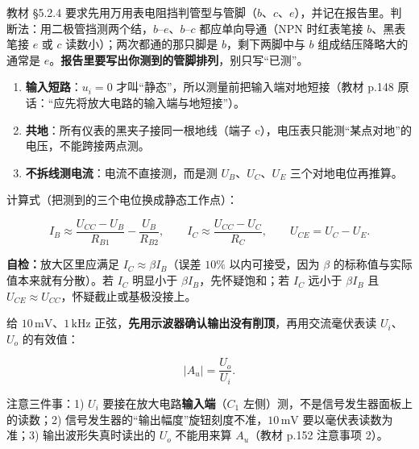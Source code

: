 \documentclass[11pt]{ctexart}
\let\orighdr\hdr
\renewcommand{\hdr}[2]{\needspace{12\baselineskip}\orighdr{#1}{#2}}
\let\origsubhdr\subhdr
\renewcommand{\subhdr}[1]{\needspace{3\baselineskip}\origsubhdr{#1}}
\begin{document}


教材 §5.2.4 要求先用万用表电阻挡判管型与管脚（$b$、$c$、$e$），并记在报告里。判断法：用二极管挡测两个结，$b$--$e$、$b$--$c$ 都应单向导通（NPN 时红表笔接 $b$、黑表笔接 $e$ 或 $c$ 读数小）；两次都通的那只脚是 $b$，剩下两脚中与 $b$ 组成结压降略大的通常是 $e$。\textbf{报告里要写出你测到的管脚排列}，别只写“已测”。


\begin{enumerate}
\item \textbf{输入短路}：$u_i=0$ 才叫“静态”，所以测量前把输入端对地短接（教材 p.148 原话：“应先将放大电路的输入端与地短接”）。
\item \textbf{共地}：所有仪表的黑夹子接同一根地线（端子 c），电压表只能测“某点对地”的电压，不能跨接两点测。
\item \textbf{不拆线测电流}：电流不直接测，而是测 $U_B$、$U_C$、$U_E$ 三个对地电位再推算。
\end{enumerate}

计算式（把测到的三个电位换成静态工作点）：

\[
I_B\approx\frac{U_{CC}-U_B}{R_{B1}}-\frac{U_B}{R_{B2}},\qquad
I_C\approx\frac{U_{CC}-U_C}{R_C},\qquad
U_{CE}=U_C-U_E .
\]


\textbf{自检：}放大区里应满足 $I_C\approx\beta I_B$（误差 $10\%$ 以内可接受，因为 $\beta$ 的标称值与实际值本来就有分散）。若 $I_C$ 明显小于 $\beta I_B$，先怀疑饱和；若 $I_C$ 远小于 $\beta I_B$ 且 $U_{CE}\approx U_{CC}$，怀疑截止或基极没接上。


给 $10\,\mathrm{mV}$、$1\,\mathrm{kHz}$ 正弦，\textbf{先用示波器确认输出没有削顶}，再用交流毫伏表读 $U_i$、$U_o$ 的有效值：

\[
|A_u|=\frac{U_o}{U_i}.
\]

注意三件事：1)  $U_i$ 要接在放大电路\textbf{输入端}（$C_1$ 左侧）测，不是信号发生器面板上的读数；2)  信号发生器的“输出幅度”旋钮刻度不准，$10\,\mathrm{mV}$ 要以毫伏表读数为准；3)  输出波形失真时读出的 $U_o$ 不能用来算 $A_u$（教材 p.152 注意事项 2）。
\end{document}
